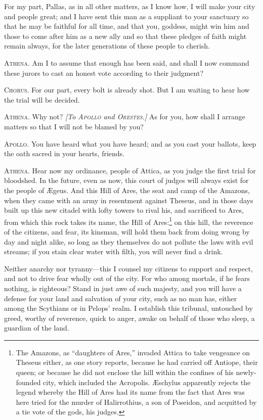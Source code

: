 \documentclass[12pt]{article}
\begin{document}
For my part, Pallas, as in all other matters, as I know how, I will make your city and people great; and I have sent this man as a suppliant to your sanctuary so that he may be faithful for all time, and that you, goddess, might win him and those to come after him as a new ally and so that these pledges of faith might remain always, for the later generations of these people to cherish.

\textsc{Athena.} Am I to assume that enough has been said, and shall I now command these jurors to cast an honest vote according to their judgment?

\textsc{Chorus.} For our part, every bolt is already shot. But I am waiting to hear how the trial will be decided.

\textsc{Athena.} Why not? \textit{[To \textsc{Apollo} and \textsc{Orestes.}]} As for you, how shall I arrange matters so that I will not be blamed by you?

\textsc{Apollo.} You have heard what you have heard; and as you cast your ballots, keep the oath sacred in your hearts, friends.

\textsc{Athena.} Hear now my ordinance, people of Attica, as you judge the first trial for bloodshed. In the future, even as now, this court of judges will always exist for the people of {\AE}geus. And this Hill of Ares, the seat and camp of the Amazons, when they came with an army in resentment against Theseus, and in those days built up this new citadel with lofty towers to rival his, and sacrificed to Ares, from which this rock takes its name, the Hill of Ares:\footnote{The Amazons, as ``daughters of Ares,'' invaded Attica to take vengeance on Theseus either, as one story reports, because he had carried off Antiope, their queen; or because he did not enclose the hill within the confines of his newly-founded city, which included the Acropolis. {\AE}schylus apparently rejects the legend whereby the Hill of Ares had its name from the fact that Ares was here tried for the murder of Halirrothius, a son of Poseidon, and acquitted by a tie vote of the gods, his judges.} on this hill, the reverence of the citizens, and fear, its kinsman, will hold them back from doing wrong by day and night alike, so long as they themselves do not pollute the laws with evil streams; if you stain clear water with filth, you will never find a drink.

Neither anarchy nor tyranny---this I counsel my citizens to support and respect, and not to drive fear wholly out of the city. For who among mortals, if he fears nothing, is righteous? Stand in just awe of such majesty, and you will have a defense for your land and salvation of your city, such as no man has, either among the Scythians or in Pelops' realm. I establish this tribunal, untouched by greed, worthy of reverence, quick to anger, awake on behalf of those who sleep, a guardian of the land.
\end{document}
